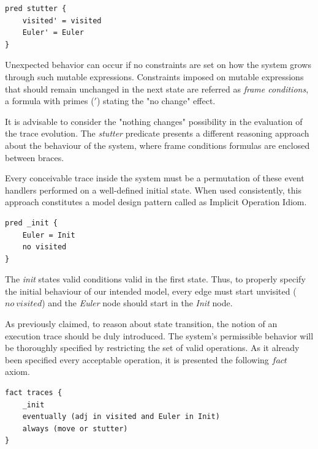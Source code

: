 \begin{lstlisting}[title={\textit{Eulerian} stutter event.}, otherkeywords = {pred, ', \=}, floatplacement=H]
pred stutter {
    visited' = visited
    Euler' = Euler
}
\end{lstlisting}

Unexpected behavior can occur if no constraints are set on how the system grows through such mutable expressions. Constraints imposed on mutable expressions that should remain unchanged in the next state are referred as \textit{frame conditions}, a formula with primes ($'$) stating the "no change" effect. \cite{alloy-docs}

It is advisable to consider the "nothing changes" possibility in the evaluation of the trace evolution. The \textit{stutter} predicate presents a different reasoning approach about the behaviour of the system, where frame conditions formulas are enclosed between braces. 

Every conceivable trace inside the system must be a permutation of these event handlers performed on a well-defined initial state. When used consistently, this approach constitutes a model design pattern called as Implicit Operation Idiom. \cite{gheyi2007formally}

\begin{lstlisting}[title={\textit{Eulerian} Initial State.}, otherkeywords = {pred, ', \=, no}, floatplacement=H]
pred _init {
    Euler = Init
    no visited
}
\end{lstlisting}

The \textit{init} states valid conditions valid in the first state. Thus, to properly specify the initial behaviour of our intended model, every edge must start unvisited ($no\ visited$) and the \textit{Euler} node should start in the \textit{Init} node.

As previously claimed, to reason about state transition, the notion of an execution trace should be duly introduced. The system's permissible behavior will be thoroughly specified by restricting the set of valid operations. As it already been specified every acceptable operation, it is presented the following $fact$ axiom. 

\begin{lstlisting}[title={Trace constraint through the use of an axiom.}, otherkeywords = {fact, ', \=, no, eventually, in\ , and, always, or}, floatplacement=H]
fact traces {
    _init
    eventually (adj in visited and Euler in Init)
    always (move or stutter)
}
\end{lstlisting}

